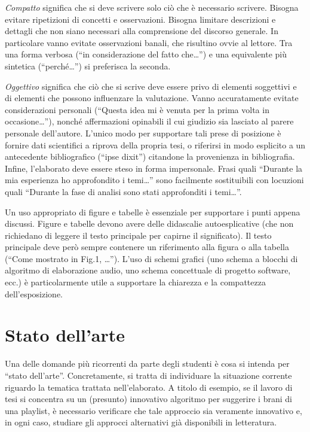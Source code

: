 \documentclass[12pt]{report}
\begin{document}
        {\em Compatto} significa che si deve scrivere solo ci\`o che \`e necessario scrivere. Bisogna evitare ripetizioni di concetti e osservazioni. Bisogna limitare descrizioni e dettagli che non siano necessari alla comprensione del discorso generale. In particolare vanno evitate osservazioni banali, che risultino ovvie al lettore. Tra una forma verbosa (``in considerazione del fatto che\ldots'') e una equivalente pi\`u sintetica (``perch\'e\ldots'') si preferisca la seconda.

        {\em Oggettivo} significa che ci\`o che si scrive deve essere privo di elementi soggettivi e di elementi che possono influenzare la valutazione. Vanno accuratamente evitate considerazioni personali (``Questa idea mi \`e venuta per la prima volta in occasione\ldots''), nonch\'e affermazioni opinabili il cui giudizio sia lasciato al parere personale dell'autore. L'unico modo per supportare tali prese di posizione è fornire dati scientifici a riprova della propria tesi, o riferirsi in modo esplicito a un antecedente bibliografico (``ipse dixit'') citandone la provenienza in bibliografia. Infine, l'elaborato deve essere steso in forma impersonale. Frasi quali ``Durante la mia esperienza ho approfondito i temi\dots'' sono facilmente sostituibili con locuzioni quali ``Durante la fase di analisi sono stati approfonditi i temi\dots''.

    Un uso appropriato di figure e tabelle \`e essenziale per supportare i punti appena discussi. Figure e tabelle devono avere delle didascalie autoesplicative (che non richiedano di leggere il testo principale per capirne il significato). Il testo principale deve per\`o sempre contenere un riferimento alla figura o alla tabella (``Come mostrato in Fig.1, \ldots''). L'uso di schemi grafici (uno schema a blocchi di algoritmo di elaborazione audio, uno schema concettuale di progetto software, ecc.) \`e particolarmente utile a supportare la chiarezza e la compattezza dell'esposizione.

%
%

    \chapter{Stato dell'arte}
    \label{chap:stato_arte}


    Una delle domande più ricorrenti da parte degli studenti \`e cosa si intenda per ``stato dell'arte''. Concretamente, si tratta di individuare la situazione corrente riguardo la tematica trattata nell'elaborato. A titolo di esempio, se il lavoro di tesi si concentra su un (presunto) innovativo algoritmo per suggerire i brani di una playlist, è necessario verificare che tale approccio sia veramente innovativo e, in ogni caso, studiare gli approcci alternativi già disponibili in letteratura.
\end{document}
